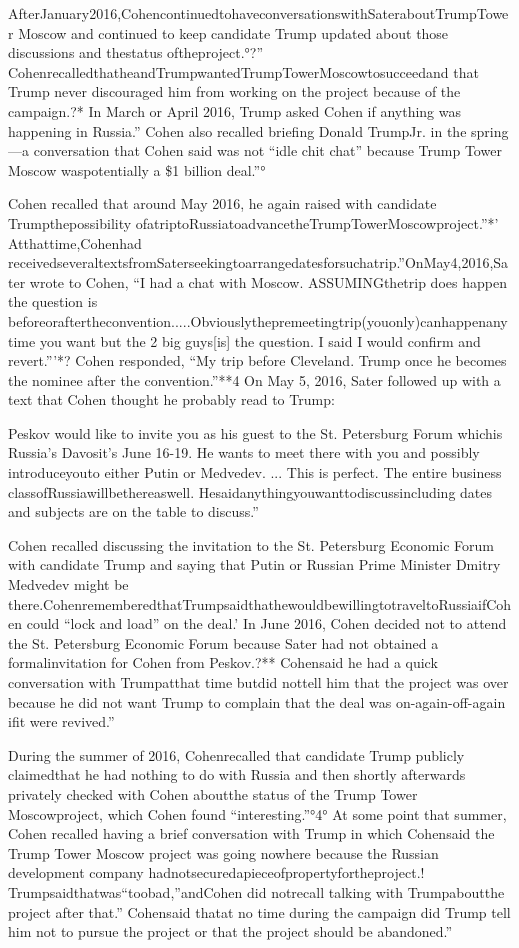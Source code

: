AfterJanuary2016,CohencontinuedtohaveconversationswithSateraboutTrumpTower Moscow and continued to keep candidate Trump updated about those discussions and thestatus oftheproject.°?” CohenrecalledthatheandTrumpwantedTrumpTowerMoscowtosucceedand that Trump never discouraged him from working on the project because of the campaign.?* In March or April 2016, Trump asked Cohen if anything was happening in Russia.” Cohen also recalled briefing Donald TrumpJr. in the spring—a conversation that Cohen said was not “idle chit chat” because Trump Tower Moscow waspotentially a \$1 billion deal.”°

Cohen recalled that around May 2016, he again raised with candidate Trumpthepossibility ofatriptoRussiatoadvancetheTrumpTowerMoscowproject.”*' Atthattime,Cohenhad receivedseveraltextsfromSaterseekingtoarrangedatesforsuchatrip.”OnMay4,2016,Sater wrote to Cohen, “I had a chat with Moscow. ASSUMINGthetrip does happen the question is beforeoraftertheconvention.....Obviouslythepremeetingtrip(youonly)canhappenanytime you want but the 2 big guys[is] the question. I said I would confirm and revert.”’*? Cohen responded, “My trip before Cleveland. Trump once he becomes the nominee after the convention.”**4 On May 5, 2016, Sater followed up with a text that Cohen thought he probably read to Trump:

Peskov would like to invite you as his guest to the St. Petersburg Forum whichis Russia’s Davosit’s June 16-19. He wants to meet there with you and possibly introduceyouto either Putin or Medvedev. ... This is perfect. The entire business classofRussiawillbethereaswell. Hesaidanythingyouwanttodiscussincluding dates and subjects are on the table to discuss.”

Cohen recalled discussing the invitation to the St. Petersburg Economic Forum with candidate Trump and saying that Putin or Russian Prime Minister Dmitry Medvedev might be there.CohenrememberedthatTrumpsaidthathewouldbewillingtotraveltoRussiaifCohen could “lock and load” on the deal.’ In June 2016, Cohen decided not to attend the St. Petersburg Economic Forum because Sater had not obtained a formalinvitation for Cohen from Peskov.?** Cohensaid he had a quick conversation with Trumpatthat time butdid nottell him that the project was over because he did not want Trump to complain that the deal was on-again-off-again ifit were revived.”

During the summer of 2016, Cohenrecalled that candidate Trump publicly claimedthat he had nothing to do with Russia and then shortly afterwards privately checked with Cohen aboutthe status of the Trump Tower Moscowproject, which Cohen found “interesting.”°4° At some point that summer, Cohen recalled having a brief conversation with Trump in which Cohensaid the Trump Tower Moscow project was going nowhere because the Russian development company hadnotsecuredapieceofpropertyfortheproject.! Trumpsaidthatwas“toobad,”andCohen did notrecall talking with Trumpaboutthe project after that.” Cohensaid thatat no time during the campaign did Trump tell him not to pursue the project or that the project should be abandoned.”

